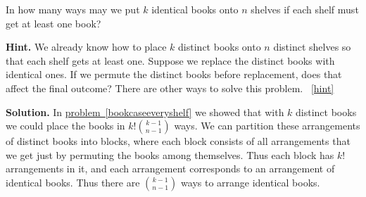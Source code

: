 \documentclass{book}
\begin{document}
\setcounter{project}{127}
\addtocounter{project}{-1}
\begin{activity}[]\label{activity-120}
\hypertarget{p-875}{}%
In how many ways may we put \(k\) identical books onto \(n\) shelves if each shelf must get at least one book?%
\par\smallskip%
\noindent\textbf{Hint.}\hypertarget{hint-85}{}\quad%
\hypertarget{p-876}{}%
We already know how to place \(k\) distinct books onto \(n\) distinct shelves so that each shelf gets at least one. Suppose we replace the distinct books with identical ones. If we permute the distinct books before replacement, does that affect the final outcome? There are other ways to solve this problem.%
~\hfill{\tiny\hyperlink{a-127}{[hint]}\hypertarget{q-127}{}}\par\smallskip%
\noindent\textbf{Solution.}\hypertarget{solution-75}{}\quad%
\hypertarget{p-877}{}%
In \hyperref[bookcaseeveryshelf]{problem~\ref{bookcaseeveryshelf}} we showed that with \(k\) distinct books we could place the books in \(k!\binom{k-1}{n-1}\) ways. We can partition these arrangements of distinct books into blocks, where each block consists of all arrangements that we get just by permuting the books among themselves. Thus each block has \(k!\) arrangements in it, and each arrangement corresponds to an arrangement of identical books. Thus there are \(\binom{k-1}{n-1}\) ways to arrange identical books.%
\end{activity}

\clearpage
\end{document}
